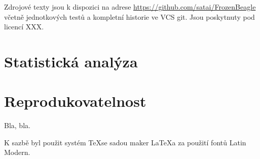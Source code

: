 Zdrojové texty jsou k dispozici na adrese \url {https://github.com/satai/FrozenBeagle} včetně jednotkových testů a kompletní historie ve VCS git. Jsou poskytnuty pod licencí XXX.

\section{Statistická analýza}

\section{Reprodukovatelnost}

Bla, bla.

K sazbě byl použit systém \TeX se sadou maker \LaTeX a za použití fontů Latin Modern.
